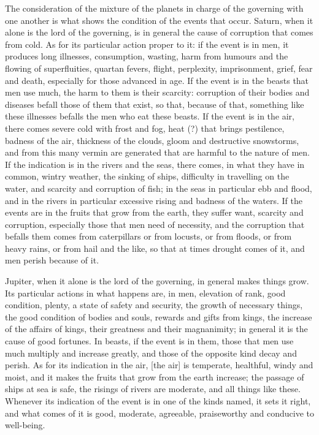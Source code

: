 \documentclass[11pt]{article}
\newcommand{\Fol}[1]{\marginpar{\footnotesize\color{gray}f.\,#1}}
\begin{document}
\par \Fol{28v}The consideration of the mixture of the planets in charge of the governing with one another is what shows the condition of the events that occur. Saturn, when it alone is the lord of the governing, is in general the cause of corruption that comes from cold. As for its particular action proper to it: if the event is in men, it produces long illnesses, consumption, wasting, harm from humours and the flowing of superfluities, quartan fevers, flight, perplexity, imprisonment, grief, fear and death, especially for those advanced in age. If the event is in the beasts that men use much, the harm to them is their scarcity: corruption of their bodies and diseases befall those of them that exist, so that, because of that, something like these illnesses befalls the men who eat these beasts. If the event is in the air, there comes severe cold with frost and fog, heat (?) that brings pestilence, badness of the air, thickness of the clouds, gloom and destructive snowstorms, and from this many vermin are generated that are harmful to the nature of men. If the indication is in the rivers and the seas, there comes, in what they have in common, wintry weather, the sinking of ships, difficulty in travelling on the water, and scarcity and corruption of fish; in the seas in particular ebb and flood, and in the rivers in particular excessive rising and badness of the waters. If the events are in the fruits that grow from the earth, they suffer want, scarcity and corruption, especially those that men need of necessity, and the corruption that befalls them comes from caterpillars or from locusts, or from floods, or from heavy rains, or from hail and the like, so that at times drought comes of it, and men perish because of it.\par
\par Jupiter, when it alone is the lord of the governing, in general makes things grow. Its particular actions in what happens are, in men, elevation of rank, good condition, plenty, a state of safety and security, the growth of necessary things, the good condition of bodies and souls, rewards and gifts from kings, the increase of the affairs of kings, their greatness and their magnanimity; in general it is the cause of good fortunes. In beasts, if the event is in them, those that men use much multiply and increase greatly, and those of the opposite kind decay and perish. As for its indication in the air, [the air] is temperate, healthful, windy and moist, and it makes the fruits that grow from the earth increase; the passage of ships at sea is safe, the risings of rivers are moderate, and all things like these. Whenever its indication of the event is in one of the kinds named, it sets it right, and what comes of it is good, moderate, agreeable, praiseworthy and conducive to well-being.\par
\end{document}
